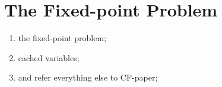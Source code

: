 \section{The Fixed-point Problem}
\begin{enumerate}
\item the fixed-point problem;
\item cached variables;
\item and refer everything else to CF-paper;
\end{enumerate}
